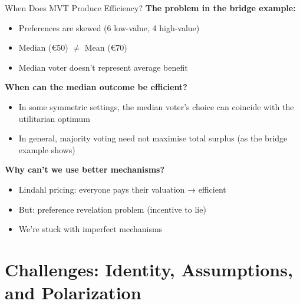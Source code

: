 \documentclass[10pt]{beamer}
\begin{document}
\begin{frame}{When Does MVT Produce Efficiency?}
\textbf{The problem in the bridge example:}
\begin{itemize}
\item Preferences are \alert{skewed} (6 low-value, 4 high-value)
\item Median (€50) $\neq$ Mean (€70)
\item Median voter doesn't represent average benefit
\end{itemize}



\textbf{When can the median outcome be efficient?}
\begin{itemize}
\item In some symmetric settings, the median voter’s choice can coincide with the utilitarian optimum
\item In general, majority voting need not maximise total surplus (as the bridge example shows)
\end{itemize}




\textbf{Why can't we use better mechanisms?}
\begin{itemize}
\item Lindahl pricing: everyone pays their valuation → efficient
\item But: preference revelation problem (incentive to lie)
\item We're stuck with imperfect mechanisms
\end{itemize}
\end{frame}


\section{Challenges: Identity, Assumptions, and Polarization}
\end{document}
